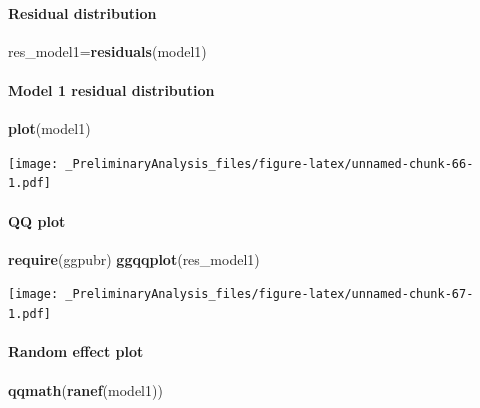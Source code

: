 \documentclass[
]{article}
\newenvironment{Shaded}{\begin{snugshade}}{\end{snugshade}}
\newcommand{\KeywordTok}[1]{\textcolor[rgb]{0.13,0.29,0.53}{\textbf{#1}}}
\newcommand{\NormalTok}[1]{#1}
\begin{document}
\hypertarget{residual-distribution-3}{%
\paragraph{Residual distribution}\label{residual-distribution-3}}

\begin{Shaded}
\begin{Highlighting}[]
\NormalTok{res_model1=}\KeywordTok{residuals}\NormalTok{(model1)}
\end{Highlighting}
\end{Shaded}

\hypertarget{model-1-residual-distribution-3}{%
\paragraph{Model 1 residual
distribution}\label{model-1-residual-distribution-3}}

\begin{Shaded}
\begin{Highlighting}[]
\KeywordTok{plot}\NormalTok{(model1)}
\end{Highlighting}
\end{Shaded}

\texttt{[image: \_PreliminaryAnalysis\_files/figure-latex/unnamed-chunk-66-1.pdf]}

\hypertarget{qq-plot-3}{%
\paragraph{QQ plot}\label{qq-plot-3}}

\begin{Shaded}
\begin{Highlighting}[]
\KeywordTok{require}\NormalTok{(ggpubr)}
\KeywordTok{ggqqplot}\NormalTok{(res_model1)}
\end{Highlighting}
\end{Shaded}

\texttt{[image: \_PreliminaryAnalysis\_files/figure-latex/unnamed-chunk-67-1.pdf]}

\hypertarget{random-effect-plot-3}{%
\paragraph{Random effect plot}\label{random-effect-plot-3}}

\begin{Shaded}
\begin{Highlighting}[]
\KeywordTok{qqmath}\NormalTok{(}\KeywordTok{ranef}\NormalTok{(model1))}
\end{Highlighting}
\end{Shaded}
\end{document}
